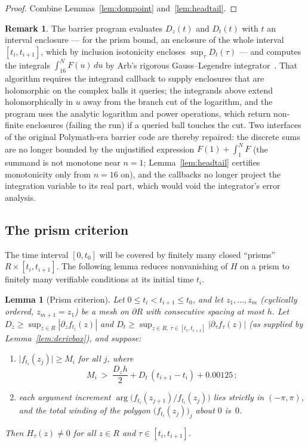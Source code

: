 \documentclass[11pt]{article}
\newtheorem{lemma}[theorem]{Lemma}
\theoremstyle{definition}
\newtheorem{remark}[theorem]{Remark}
\begin{document}
\begin{proof}
Combine Lemmas~\ref{lem:dompoint} and~\ref{lem:headtail}.
\end{proof}

\begin{remark}\label{rem:quadrature}
The barrier program evaluates $D_z(t)$ and $D_t(t)$ with $t$ an
interval enclosure --- for the prism bound, an enclosure of the
whole interval $[t_i,t_{i+1}]$, which by inclusion isotonicity
encloses $\sup_\tau D_t(\tau)$ --- and computes the integrals
$\int_{16}^NF(u)\,du$ by Arb's rigorous Gauss--Legendre
integrator~\cite{JohanssonIntegration}. That algorithm requires the
integrand callback to supply enclosures that are holomorphic on the
complex balls it queries; the integrands above extend
holomorphically in $u$ away from the branch cut of the logarithm,
and the program uses the analytic logarithm and power operations,
which return non-finite enclosures (failing the run) if a queried
ball touches the cut. Two interfaces of the original Polymath-era
barrier code are thereby repaired: the discrete sums are no longer
bounded by the unjustified expression $F(1)+\int_1^NF$ (the summand
is not monotone near $n=1$; Lemma~\ref{lem:headtail} certifies
monotonicity only from $n=16$ on), and the callbacks no longer
project the integration variable to its real part, which would void
the integrator's error analysis.
\end{remark}

\subsection{The prism criterion}\label{sec:prism}

The time interval $[0,t_0]$ will be covered by finitely many closed
``prisms'' $R\times[t_i,t_{i+1}]$. The following lemma reduces
nonvanishing of $H$ on a prism to finitely many verifiable
conditions at its initial time $t_i$.

\begin{lemma}[Prism criterion]\label{lem:prism}
Let $0\le t_i<t_{i+1}\le t_0$, and let $z_1,\dots,z_m$
(cyclically ordered, $z_{m+1}=z_1$) be a mesh on $\partial R$ with
consecutive spacing at most $h$. Let $D_z\ge\sup_{z\in R}|\partial_zf_{t_i}(z)|$ and
$D_t\ge\sup_{z\in R,\ \tau\in[t_i,t_{i+1}]}
|\partial_\tau f_\tau(z)|$ (as supplied by
Lemma~\ref{lem:derivbox}), and suppose:
\begin{enumerate}
\item[\textup{(a)}] $\bigl|f_{t_i}(z_j)\bigr|\ge M_i$ for all $j$,
where
\begin{equation}\label{eq:gate}
M_i\ >\ \frac{D_{z}h}{2}
+D_{t}\,(t_{i+1}-t_i)+0.00125\,;
\end{equation}
\item[\textup{(b)}] each argument increment
$\arg\bigl(f_{t_i}(z_{j+1})/f_{t_i}(z_j)\bigr)$ lies strictly in
$(-\pi,\pi)$, and the total winding of the polygon
$\bigl(f_{t_i}(z_j)\bigr)_j$ about $0$ is~$0$.
\end{enumerate}
Then $H_\tau(z)\neq0$ for all $z\in R$ and
$\tau\in[t_i,t_{i+1}]$.
\end{lemma}
\end{document}
